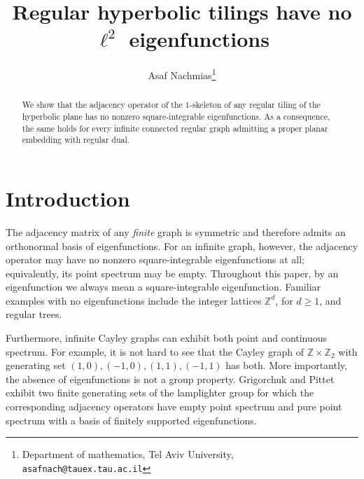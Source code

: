 \documentclass[11pt]{article}
\title{Regular hyperbolic tilings have no $\ell^2$ eigenfunctions}
\author{Asaf Nachmias\footnote{Department of mathematics, Tel Aviv University,  \texttt{asafnach@tauex.tau.ac.il}}}
\date{}
\theoremstyle{remark}
\newcommand{\Z}{\mathbb Z}
\begin{document}
\maketitle

\begin{abstract}We show that the adjacency operator of the $1$-skeleton of any regular tiling of the hyperbolic plane has no nonzero square-integrable eigenfunctions. As a consequence, the same holds for every infinite connected regular graph admitting a proper planar embedding with regular dual.
\end{abstract}


\section{Introduction}

The adjacency matrix of any \emph{finite} graph is symmetric and therefore admits an orthonormal basis of eigenfunctions. For an infinite graph, however, the adjacency operator may have no nonzero square-integrable eigenfunctions at all; equivalently, its point spectrum may be empty. Throughout this paper, by an eigenfunction we always mean a square-integrable eigenfunction. Familiar examples with no eigenfunctions include the integer lattices $\Z^d$, for $d\geq 1$, and regular trees.

Furthermore, infinite Cayley graphs can exhibit both point and continuous spectrum. For example, it is not hard to see that the Cayley graph of $\Z\times\Z_2$ with generating set $(1,0), (-1,0), (1,1),(-1,1)$ has both. More importantly, the absence of eigenfunctions is not a group property. Grigorchuk and Pittet \cite[Corollary 1.3]{GrigPittet24} exhibit two finite generating sets of the lamplighter group for which the corresponding adjacency operators have empty point spectrum and pure point spectrum with a basis of finitely supported eigenfunctions.

\end{document}
